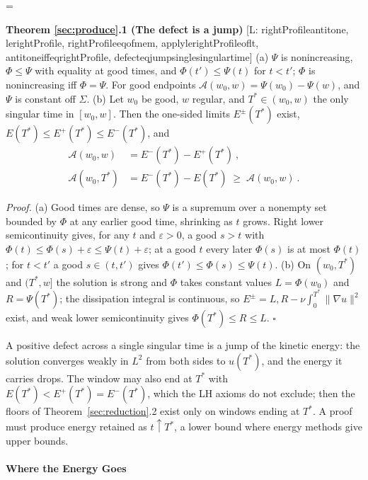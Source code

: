 \documentclass[letterpaper,twocolumn]{article}
\newcommand{\lean}[1]{{\footnotesize\def\_{\textunderscore\allowbreak}%
\hspace{0pt}[L: {\ttfamily\fontdimen3\font=2pt\fontdimen4\font=1pt #1}]}}
\newcommand{\A}{\mathcal{A}}
\begin{document}
\begin{list}{}{\leftmargin=\parindent\rightmargin=0pt}
\item
\textbf{Theorem \ref{sec:produce}.1 (The defect is a jump)}
\lean{rightProfile\_antitone, le\_rightProfile, rightProfile\_eq\_of\_mem,
apply\_le\_rightProfile\_of\_lt, antitone\_iff\_eq\_rightProfile,
defect\_eq\_jump\_single\_singular\_time}
(a) $\Psi$ is nonincreasing, $\Phi \leq \Psi$ with equality at good times,
and $\Phi(t') \leq \Psi(t)$ for $t < t'$; $\Phi$ is nonincreasing iff
$\Phi = \Psi$. For good endpoints $\A(w_0,w) = \Psi(w_0) - \Psi(w)$, and
$\Psi$ is constant off $\Sigma$.
(b) Let $w_0$ be good, $w$ regular, and $T^* \in (w_0,w)$ the only
singular time in $[w_0,w]$. Then the one-sided limits $E^\pm(T^*)$ exist,
$E(T^*) \leq E^+(T^*) \leq E^-(T^*)$, and
\begin{align*}
\A(w_0, w) &= E^-(T^*) - E^+(T^*) \ , \\
\A(w_0, T^*) &= E^-(T^*) - E(T^*) \;\geq\; \A(w_0,w) \ .
\end{align*}
\end{list}
{\it Proof.} (a) Good times are dense, so $\Psi$ is a supremum over a
nonempty set bounded by $\Phi$ at any earlier good time, shrinking as $t$
grows. Right lower semicontinuity gives, for any $t$ and $\varepsilon >
0$, a good $s > t$ with $\Phi(t) \leq \Phi(s) + \varepsilon \leq \Psi(t)
+ \varepsilon$; at a good $t$ every later $\Phi(s)$ is at most $\Phi(t)$;
for $t < t'$ a good $s \in (t,t')$ gives $\Phi(t') \leq \Phi(s) \leq
\Psi(t)$. (b) On $(w_0,T^*)$ and $(T^*,w]$ the solution is strong and
$\Phi$ takes constant values $L = \Phi(w_0)$ and $R = \Psi(T^*)$; the
dissipation integral is continuous, so $E^\pm = L, R -
\nu\int_0^{T^*}\|\nabla u\|^2$ exist, and weak lower semicontinuity gives
$\Phi(T^*) \leq R \leq L$. \hspace*{\fill}$\square$

A positive defect across a single singular time is a jump of the kinetic
energy: the solution converges weakly in $L^2$ from both sides to
$u(T^*)$, and the energy it carries drops. The window may also end at
$T^*$ with $E(T^*) < E^+(T^*) = E^-(T^*)$, which the LH axioms do not
exclude; then the floors of Theorem~\ref{sec:reduction}.2 exist only on
windows ending at $T^*$. A proof must produce energy retained as $t
\uparrow T^*$, a lower bound where energy methods give upper bounds.

\paragraph*{Where the Energy Goes}
\end{document}
